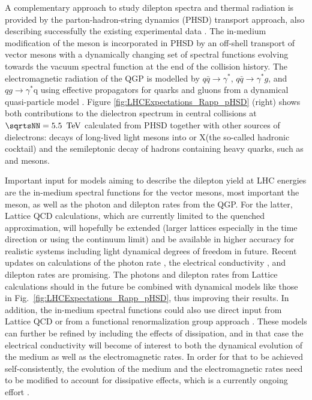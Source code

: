 \documentclass[../report.tex]{subfiles}
\begin{document}
A complementary approach to study dilepton spectra and thermal radiation is provided by the parton-hadron-string dynamics (PHSD) transport approach, also describing successfully the existing experimental data \cite{Linnyk:2015rco,Cassing:2009vt}. The in-medium modification of the \PGr meson is incorporated in PHSD by an off-shell transport of vector mesons with a dynamically changing set of spectral functions \cite{Bratkovskaya:2007jk} evolving towards the vacuum spectral function at the end of the collision history. The electromagnetic radiation of the QGP is modelled by $q\bar{q}\rightarrow\gamma^{*}$, $q\bar{q}\rightarrow\gamma^{*}g$, and $qg\rightarrow\gamma^{*}$q using effective propagators for quarks and gluons from a dynamical quasi-particle model \cite{Linnyk:2010vb}. Figure \ref{fig:LHCExpectations_Rapp_pHSD} (right) shows both contributions to the dielectron spectrum in central \PbPb{} collisions at $\sqrtsNN = \unit[5.5]{\UTeV}$ calculated from PHSD together with other sources of dielectrons: decays of long-lived light mesons into \Pepem or X\Pepem (the so-called hadronic cocktail) and the semileptonic decay of hadrons containing heavy quarks, such as \PD and \PB mesons. 

Important input for models aiming to describe the dilepton yield at LHC energies are the in-medium spectral functions for the vector mesons, most important the \PGr meson, as well as the photon and dilepton rates from the QGP. For the latter, Lattice QCD calculations, which are currently limited to the quenched approximation, will hopefully be extended (\eg larger lattices especially in the time direction or using the continuum limit) and be available in higher accuracy for realistic systems including light dynamical degrees of freedom in future. Recent updates on calculations of the photon rate \cite{Ghiglieri:2016tvj}, the electrical conductivity \cite{Aarts:2014nba}, and dilepton rates \cite{Ding:2016hua} are promising.
The photons and dilepton rates from Lattice calculations should in the future be combined with dynamical models like those in Fig.~\ref{fig:LHCExpectations_Rapp_pHSD}, thus improving their results. In addition, the in-medium spectral functions could also use direct input from Lattice QCD \cite{Aarts:2005hg,Brandt:2015aqk} or from a functional renormalization group approach \cite{Jung:2016yxl}. These models can further be refined by including the effects of dissipation, and in that case the electrical conductivity will become of interest to both the dynamical evolution of the medium as well as the electromagnetic rates. In order for that to be achieved self-consistently, the evolution of the medium and the electromagnetic rates need to be modified to account for dissipative effects, which is a currently ongoing effort \cite{Paquet:2015lta,Vujanovic:2017wtw,Vujanovic:2017psb}.
\end{document}
